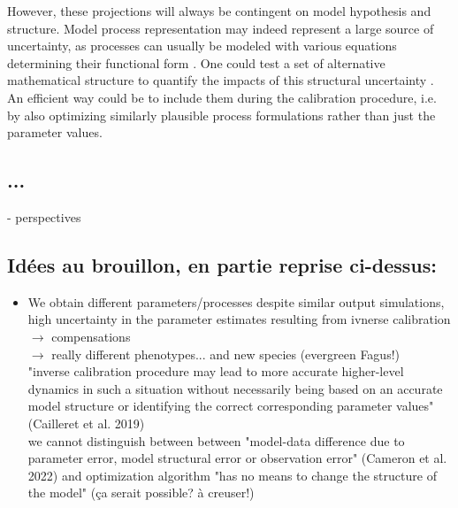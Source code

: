 \documentclass[letterpaper,8pt]{extarticle}  %
\begin{document}
\begin{doublespacing}
\begin{linenumbers}
However, these projections will always be contingent on model hypothesis and structure. Model process representation may indeed represent a large source of uncertainty, as processes can usually be modeled with various equations determining their functional form \citep{Keenan2011}. One could test a set of alternative mathematical structure to quantify the impacts of this structural uncertainty \citep{Huber2020}. An efficient way could be to include them during the calibration procedure, i.e. by also optimizing similarly plausible process formulations rather than just the parameter values.






\subsection{...}



- perspectives




\subsection{Idées au brouillon, en partie reprise ci-dessus:}

\begin{itemize}

\item We obtain different parameters/processes despite similar output simulations, high uncertainty in the parameter estimates resulting from ivnerse calibration
$\rightarrow$ compensations \\
$\rightarrow$ really different phenotypes... and new species (evergreen Fagus!)\\
"inverse calibration procedure may lead to more accurate higher-level dynamics in such a situation without necessarily being based on an accurate model structure or identifying the correct corresponding parameter values" (Cailleret et al. 2019) \\
we cannot distinguish between between "model-data difference due to parameter error, model structural error or observation error" (Cameron et al. 2022) and optimization algorithm "has no means to change the structure of the model" (ça serait possible? à creuser!)


\end{itemize}
\end{linenumbers}
\end{doublespacing}
\end{document}
